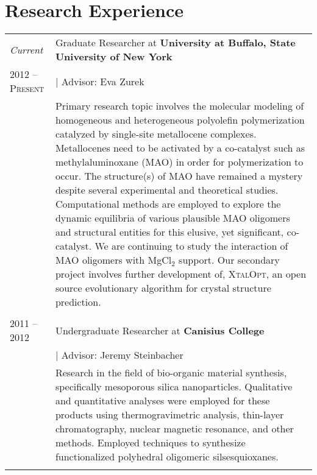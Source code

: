 \documentclass[letterpaper,10pt]{article} %
\begin{document}

\section{Research Experience}
\noindent 
\begin{tabular}{R{3cm}|p{13cm}} 

\emph{Current} & Graduate Researcher at \textbf{University at Buffalo, State University of New York} \\
\textsc{2012 -- Present} & \hspace{3mm} \small | Advisor: Eva Zurek \\ 
& \footnotesize{Primary research topic involves the molecular modeling of homogeneous and heterogeneous polyolefin polymerization catalyzed by single-site metallocene complexes. Metallocenes need to be activated by a co-catalyst such as methylaluminoxane (MAO) in order for polymerization to occur. The structure(s) of MAO have remained a mystery despite several experimental and theoretical studies. Computational methods are employed to explore the dynamic equilibria of various plausible MAO oligomers and structural entities for this elusive, yet significant, co-catalyst. We are continuing to study the interaction of MAO oligomers with MgCl$_{2}$ support. Our secondary project involves further development of, \textsc{XtalOpt}, an open source evolutionary algorithm for crystal structure prediction.}\\
 \\


\textsc{2011 -- 2012} & Undergraduate Researcher at \textbf{Canisius College} \\
& \hspace{3mm} \small | Advisor: Jeremy Steinbacher \\ 
& \footnotesize{Research in the field of bio-organic material synthesis, specifically mesoporous silica nanoparticles. Qualitative and quantitative analyses were employed for these products using thermogravimetric analysis, thin-layer chromatography, nuclear magnetic resonance, and other methods. Employed techniques to synthesize functionalized polyhedral oligomeric silsesquioxanes.}\\
 \\


\end{tabular}
\end{document}
